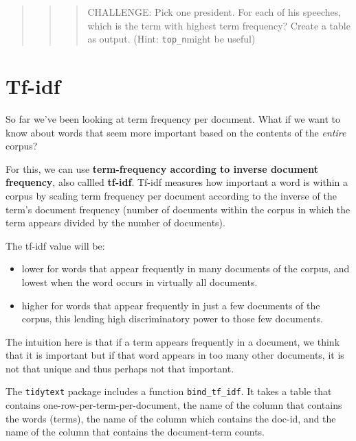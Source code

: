 \documentclass[
]{book}
\providecommand{\tightlist}{%
  \setlength{\itemsep}{0pt}\setlength{\parskip}{0pt}}
\begin{document}
\begin{quote}
\begin{quote}
\begin{quote}
CHALLENGE: Pick one president. For each of his speeches, which is the term with highest term frequency? Create a table as output. (Hint: \texttt{top\_n}might be useful)
\end{quote}
\end{quote}
\end{quote}

\hypertarget{tf-idf}{%
\section{Tf-idf}\label{tf-idf}}

So far we've been looking at term frequency per document. What if we want to know about words that seem more important based on the contents of the \emph{entire} corpus?

For this, we can use \textbf{term-frequency according to inverse document frequency}, also callled \textbf{tf-idf}. Tf-idf measures how important a word is within a corpus by scaling term frequency per document according to the inverse of the term's document frequency (number of documents within the corpus in which the term appears divided by the number of documents).

The tf-idf value will be:

\begin{itemize}
\tightlist
\item
  lower for words that appear frequently in many documents of the corpus, and lowest when the word occurs in virtually all documents.
\item
  higher for words that appear frequently in just a few documents of the corpus, this lending high discriminatory power to those few documents.
\end{itemize}

The intuition here is that if a term appears frequently in a document, we think that it is important but if that word appears in too many other documents, it is not that unique and thus perhaps not that important.

The \texttt{tidytext} package includes a function \texttt{bind\_tf\_idf}. It takes a table that contains one-row-per-term-per-document, the name of the column that contains the words (terms), the name of the column which contains the doc-id, and the name of the column that contains the document-term counts.
\end{document}
